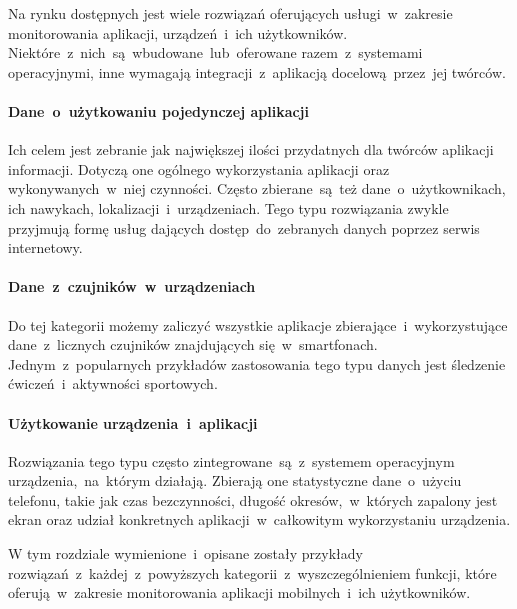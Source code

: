 Na rynku dostępnych jest wiele rozwiązań oferujących usługi~w~zakresie monitorowania aplikacji, urządzeń~i~ich użytkowników. Niektóre~z~nich~są~wbudowane~lub~oferowane razem~z~systemami operacyjnymi, inne wymagają integracji~z~aplikacją docelową~przez~jej twórców.

\paragraph{Dane~o~użytkowaniu pojedynczej aplikacji} 
Ich celem jest zebranie jak największej ilości przydatnych dla twórców aplikacji informacji. Dotyczą one ogólnego wykorzystania aplikacji oraz wykonywanych~w~niej czynności. Często zbierane~są~też dane~o~użytkownikach, ich nawykach, lokalizacji~i~urządzeniach. Tego typu rozwiązania zwykle przyjmują formę usług dających dostęp~do~zebranych danych poprzez serwis internetowy. 

\paragraph{Dane~z~czujników~w~urządzeniach} 
Do tej kategorii możemy zaliczyć wszystkie aplikacje zbierające~i~wykorzystujące dane~z~licznych czujników znajdujących się~w~smartfonach. Jednym~z~popularnych przykładów zastosowania tego typu danych jest śledzenie ćwiczeń~i~aktywności sportowych.

\paragraph{Użytkowanie urządzenia~i~aplikacji} 
Rozwiązania tego typu często zintegrowane~są~z~systemem operacyjnym urządzenia,~na~którym działają. Zbierają one statystyczne dane~o~użyciu telefonu, takie jak czas bezczynności, długość okresów,~w~których zapalony jest ekran oraz udział konkretnych aplikacji~w~całkowitym wykorzystaniu urządzenia.
\bigskip

W tym rozdziale wymienione~i~opisane zostały przykłady rozwiązań~z~każdej~z~powyższych kategorii~z~wyszczególnieniem funkcji, które oferują~w~zakresie monitorowania aplikacji mobilnych~i~ich użytkowników.
